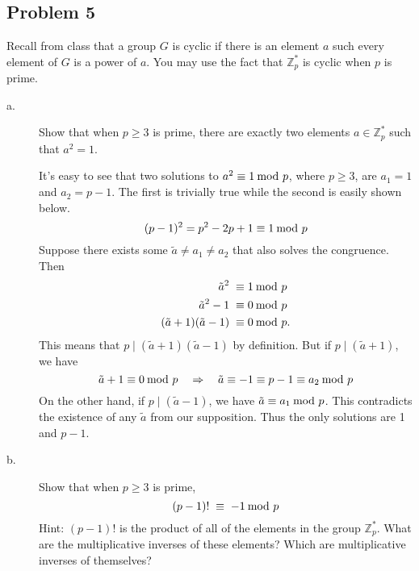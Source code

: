 \documentclass[../hw_sols.tex]{subfiles}
\begin{document}
\newpage



\subsection*{Problem 5}

Recall from class that a group $G$ is cyclic if there is an element $a$ such 
every element of $G$ is a power of $a$. You may use the fact that 
$\mathbb{Z}^*_p$ is cyclic when $p$ is prime.

\begin{description}

\item[a.] Show that when $p \geq 3$ is prime, there are exactly two elements 
$a \in \mathbb{Z}^*_p$ such that $a^2 = 1$.

\begin{solution}

It's easy to see that two solutions to $a^2 \equiv 1 \tmod{p}$, where 
$p \geq 3$, are $a_1 = 1$ and $a_2 = p - 1$. The first is trivially true while 
the second is easily shown below.
	\[ (p-1)^2 = p^2 - 2p + 1 \equiv 1 \tmod{p} \]
Suppose there exists some $\tilde{a} \neq a_1 \neq a_2$ that also solves the 
congruence. Then
\begin{align*}
	\tilde{a}^2 \; \equiv& \; 1 \tmod{p} \\
	\tilde{a}^2 - 1 \; \equiv& \; 0 \tmod{p} \\
	(\tilde{a} + 1)(\tilde{a} - 1) \; \equiv& \; 0 \tmod{p}.
\end{align*}
This means that $p \mid (\tilde{a} + 1)(\tilde{a} - 1)$ by definition. But if 
$p \mid (\tilde{a} + 1)$, we have
	\[ \tilde{a} + 1 \equiv 0 \tmod{p} 
	\quad \Rightarrow \quad 
	\tilde{a} \equiv -1 \equiv p - 1 \equiv a_2 \tmod{p} \]
On the other hand, if $p \mid (\tilde{a} - 1)$, we have 
$\tilde{a} \equiv a_1 \tmod{p}$. This contradicts the existence of any 
$\tilde{a}$ from our supposition. Thus the only solutions are 1 and $p-1$.

\end{solution}

\item[b.] Show that when $p \geq 3$ is prime,
	\[ (p - 1)! \; \equiv \; -1 \tmod{p} \]
Hint: $(p - 1)!$ is the product of all of the elements in the group 
$\mathbb{Z}^*_p$. What are the multiplicative inverses of these elements? 
Which are multiplicative inverses of themselves?


\end{description}
\end{document}
